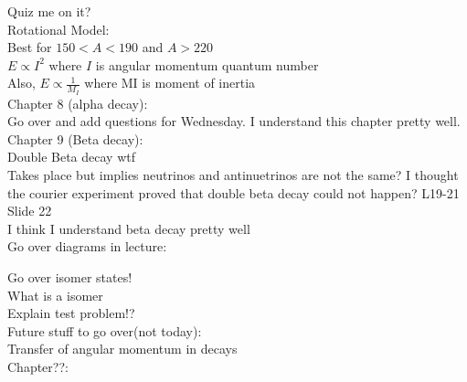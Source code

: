 \documentclass{article}
\begin{document}
\begin{multicols}{3}
Quiz me on it?\\

Rotational Model:\\
Best for $150<A<190$ and $A>220$\\
$E \propto I^{2}$ where $I$ is angular momentum quantum number\\
Also, $E \propto \frac{1}{M_{I}}$ where MI is moment of inertia\\


Chapter 8 (alpha decay):\\

Go over and add questions for Wednesday.  I understand this chapter pretty well.\\

Chapter 9 (Beta decay):\\

Double Beta decay wtf\\
Takes place but implies neutrinos and antinuetrinos are not the same?  I thought the courier experiment proved that double beta decay could not happen?  L19-21 Slide 22\\

I think I understand beta decay pretty well\\
Go over diagrams in lecture:\\
\hspace*{0.01\textwidth}

Go over isomer states!\\
\hspace*{0.01\textwidth} What is a isomer\\
\hspace*{0.01\textwidth} Explain test problem!?\\

Future stuff to go over(not today):\\
Transfer of angular momentum in decays\\

Chapter??:


\end{multicols}
\end{document}
